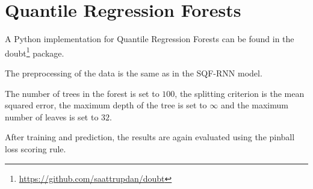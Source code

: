 \section{Quantile Regression Forests}
\label{sec:implementation-qrf}

A Python implementation for Quantile Regression Forests can 
be found in the doubt\footnote{\url{https://github.com/saattrupdan/doubt}} package.

The preprocessing of the data is the same as in the SQF-RNN model. 

The number of trees in the forest is set to \(100\), 
the splitting criterion is the mean squared error, 
the maximum depth of the tree is set to \(\infty\) and the maximum number 
of leaves is set to \(32\).

After training and prediction, the results are again evaluated 
using the pinball loss scoring rule.
